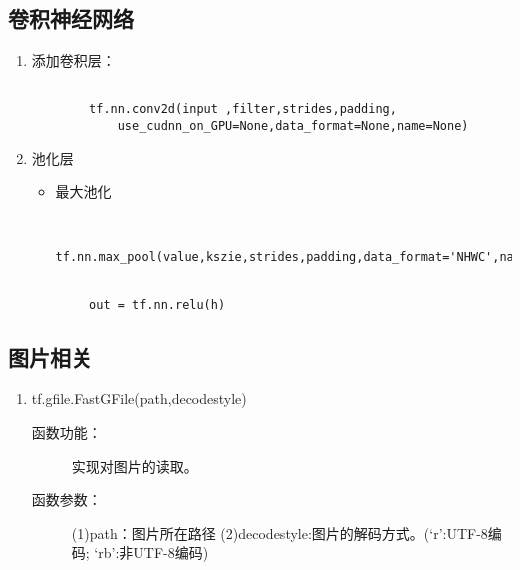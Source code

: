 \documentclass[UTF8]{article}%
\begin{document}
	\subsection{卷积神经网络}
	\begin{enumerate}
		\item 添加卷积层：
		\begin{verbatim}
		
		tf.nn.conv2d(input ,filter,strides,padding,
			use_cudnn_on_GPU=None,data_format=None,name=None)
		\end{verbatim}
		\item 池化层
		\begin{itemize}
			\item 最大池化
		\begin{verbatim}
		
		tf.nn.max_pool(value,kszie,strides,padding,data_format='NHWC',name=None)
				\end{verbatim}
		\end{itemize}
		\begin{verbatim}
		
		out = tf.nn.relu(h)	
		\end{verbatim}
	\end{enumerate}
	\subsection{图片相关}
		\begin{enumerate}
			\item tf.gfile.FastGFile(path,decodestyle) 
			\begin{description}
				\item[函数功能：] 实现对图片的读取。 
				\item[函数参数：] (1)path：图片所在路径 (2)decodestyle:图片的解码方式。(‘r’:UTF-8编码; ‘rb’:非UTF-8编码)
			\end{description}
			
			
		\end{enumerate}
\end{document}
